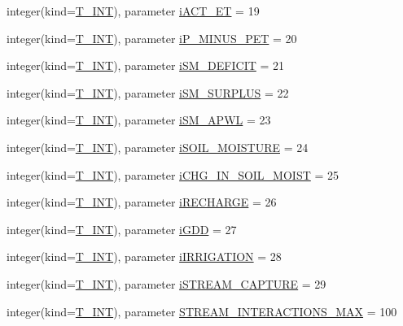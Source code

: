 \begin{DoxyCompactItemize}
\item 
integer(kind=\hyperlink{namespacetest_a6f91ebd89b58cfcc5da99faed9385c1e}{T\_\-INT}), parameter \hyperlink{namespacetest_a76800e5ee56fa8c6e4612e43dc56cb8b}{iACT\_\-ET} = 19
\item 
integer(kind=\hyperlink{namespacetest_a6f91ebd89b58cfcc5da99faed9385c1e}{T\_\-INT}), parameter \hyperlink{namespacetest_a15fc27f3f9430eb7fa5343da57124560}{iP\_\-MINUS\_\-PET} = 20
\item 
integer(kind=\hyperlink{namespacetest_a6f91ebd89b58cfcc5da99faed9385c1e}{T\_\-INT}), parameter \hyperlink{namespacetest_a383b6fea0fe65ad1c1832ef3f5922070}{iSM\_\-DEFICIT} = 21
\item 
integer(kind=\hyperlink{namespacetest_a6f91ebd89b58cfcc5da99faed9385c1e}{T\_\-INT}), parameter \hyperlink{namespacetest_a9efe22e7483171c67675c69e02b3f2c4}{iSM\_\-SURPLUS} = 22
\item 
integer(kind=\hyperlink{namespacetest_a6f91ebd89b58cfcc5da99faed9385c1e}{T\_\-INT}), parameter \hyperlink{namespacetest_a575084634243635f2b95f243548de016}{iSM\_\-APWL} = 23
\item 
integer(kind=\hyperlink{namespacetest_a6f91ebd89b58cfcc5da99faed9385c1e}{T\_\-INT}), parameter \hyperlink{namespacetest_af695837c4d2bfcaa32ecc407aad09776}{iSOIL\_\-MOISTURE} = 24
\item 
integer(kind=\hyperlink{namespacetest_a6f91ebd89b58cfcc5da99faed9385c1e}{T\_\-INT}), parameter \hyperlink{namespacetest_a93ab61cb59cc0d1c60ad3b8d26b070ff}{iCHG\_\-IN\_\-SOIL\_\-MOIST} = 25
\item 
integer(kind=\hyperlink{namespacetest_a6f91ebd89b58cfcc5da99faed9385c1e}{T\_\-INT}), parameter \hyperlink{namespacetest_a7cbbcc7ca182caf51d3afe6c583ee71b}{iRECHARGE} = 26
\item 
integer(kind=\hyperlink{namespacetest_a6f91ebd89b58cfcc5da99faed9385c1e}{T\_\-INT}), parameter \hyperlink{namespacetest_a488c52f0f7220cd4e5dfd202048bc6dd}{iGDD} = 27
\item 
integer(kind=\hyperlink{namespacetest_a6f91ebd89b58cfcc5da99faed9385c1e}{T\_\-INT}), parameter \hyperlink{namespacetest_a5143d96a60fefdc2b8959e8e0b99661b}{iIRRIGATION} = 28
\item 
integer(kind=\hyperlink{namespacetest_a6f91ebd89b58cfcc5da99faed9385c1e}{T\_\-INT}), parameter \hyperlink{namespacetest_a6dc6983b645899b34f357412d47018c5}{iSTREAM\_\-CAPTURE} = 29
\item 
integer(kind=\hyperlink{namespacetest_a6f91ebd89b58cfcc5da99faed9385c1e}{T\_\-INT}), parameter \hyperlink{namespacetest_ad3936bf03ae58d097cb5b10ed2afead6}{STREAM\_\-INTERACTIONS\_\-MAX} = 100

\end{DoxyCompactItemize}
